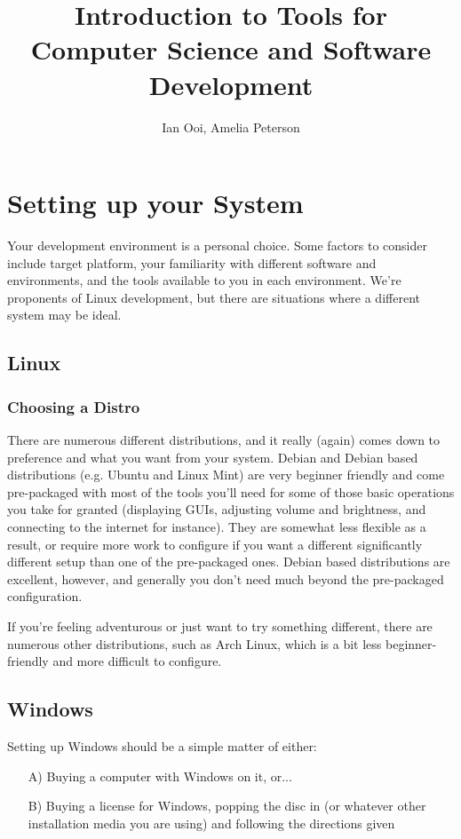 \documentclass[12pt]{book}
\title{Introduction to Tools for Computer Science and Software Development}
\author{Ian Ooi, Amelia Peterson}
\begin{document}
	\begin{titlepage}
		\maketitle
	\end{titlepage}
	\tableofcontents
	
	\chapter{Setting up your System}
		Your development environment is a personal choice.  Some factors to consider include target platform, your familiarity with different software and environments, and the tools available to you in each environment.  We're proponents of Linux development, but there are situations where a different system may be ideal.
		\section{Linux}
			\subsection{Choosing a Distro}
				There are numerous different distributions, and it really (again) comes down to preference and what you want from your system.  Debian and Debian based distributions (e.g. Ubuntu and Linux Mint) are very beginner friendly and come pre-packaged with most of the tools you'll need for some of those basic operations you take for granted (displaying GUIs, adjusting volume and brightness, and connecting to the internet for instance).  They are somewhat less flexible as a result, or require more work to configure if you want a different significantly different setup than one of the pre-packaged ones.  Debian based distributions are excellent, however, and generally you don't need much beyond the pre-packaged configuration.
				
				If you're feeling adventurous or just want to try something different, there are numerous other distributions, such as Arch Linux, which is a bit less beginner-friendly and more difficult to configure.  
		\section{Windows}
			Setting up Windows should be a simple matter of either:\begin{itemize}
				\item[A)] Buying a computer with Windows on it, or...
				\item[B)] Buying a license for Windows, popping the disc in (or whatever other installation media you are using) and following the directions given
			\end{itemize}			
			
\end{document}
